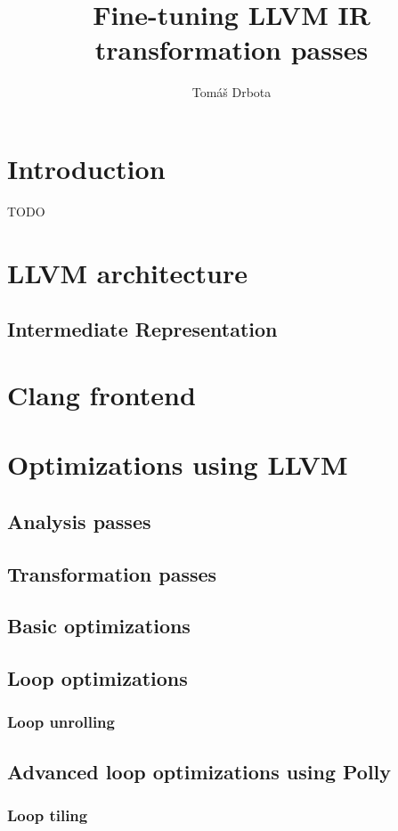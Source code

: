 \documentclass[thesis=M,english,hidelinks]{FITthesis}[2018/06/01]
\title{Fine-tuning LLVM IR transformation passes}
\author{Tomáš Drbota} %
\begin{document}
\chapter{Introduction}
TODO

\chapter{LLVM architecture}
\cite{Lattner:MSThesis02}

\section{Intermediate Representation}


\chapter{Clang frontend}

\chapter{Optimizations using LLVM}
\section{Analysis passes}

\section{Transformation passes}

\section{Basic optimizations}

\section{Loop optimizations}
\subsection{Loop unrolling}

\section{Advanced loop optimizations using Polly}
\subsection{Loop tiling}
\end{document}

